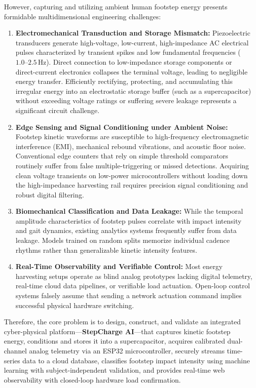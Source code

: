 However, capturing and utilizing ambient human footstep energy presents formidable multidimensional engineering challenges:
\begin{enumerate}
    \item \textbf{Electromechanical Transduction and Storage Mismatch:} Piezoelectric transducers generate high-voltage, low-current, high-impedance AC electrical pulses characterized by transient spikes and low fundamental frequencies ($1.0\text{--}2.5\,\text{Hz}$). Direct connection to low-impedance storage components or direct-current electronics collapses the terminal voltage, leading to negligible energy transfer. Efficiently rectifying, protecting, and accumulating this irregular energy into an electrostatic storage buffer (such as a supercapacitor) without exceeding voltage ratings or suffering severe leakage represents a significant circuit challenge.
    \item \textbf{Edge Sensing and Signal Conditioning under Ambient Noise:} Footstep kinetic waveforms are susceptible to high-frequency electromagnetic interference (EMI), mechanical rebound vibrations, and acoustic floor noise. Conventional edge counters that rely on simple threshold comparators routinely suffer from false multiple-triggering or missed detections. Acquiring clean voltage transients on low-power microcontrollers without loading down the high-impedance harvesting rail requires precision signal conditioning and robust digital filtering.
    \item \textbf{Biomechanical Classification and Data Leakage:} While the temporal amplitude characteristics of footstep pulses correlate with impact intensity and gait dynamics, existing analytics systems frequently suffer from data leakage. Models trained on random splits memorize individual cadence rhythms rather than generalizable kinetic intensity features.
    \item \textbf{Real-Time Observability and Verifiable Control:} Most energy harvesting setups operate as blind analog prototypes lacking digital telemetry, real-time cloud data pipelines, or verifiable load actuation. Open-loop control systems falsely assume that sending a network actuation command implies successful physical hardware switching.
\end{enumerate}

Therefore, the core problem is to design, construct, and validate an integrated cyber-physical platform---\textbf{StepCharge AI}---that captures kinetic footstep energy, conditions and stores it into a supercapacitor, acquires calibrated dual-channel analog telemetry via an ESP32 microcontroller, securely streams time-series data to a cloud database, classifies footstep impact intensity using machine learning with subject-independent validation, and provides real-time web observability with closed-loop hardware load confirmation.

